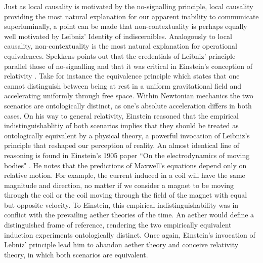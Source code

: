 Just as local causality is motivated by the no-signalling principle, local causality providing the most natural explanation for our apparent inability to communicate superluminally, a point can be made that non-contextuality is perhaps equally well motivated by Leibniz' Identity of indiscernibles. Analogously to local causality, non-contextuality is the most natural explanation for operational equivalences. Spekkens points out that the credentials of Leibniz' principle parallel those of no-signalling and that it was critical in Einstein's conception of relativity \cite{Buchanan2019,Spekkens2019}. Take for instance the equivalence principle which states that one cannot distinguish between being at rest in a uniform gravitational field and accelerating uniformly through free space. Within Newtonian mechanics the two scenarios are ontologically distinct, as one's absolute acceleration differs in both cases. On his way to general relativity, Einstein reasoned that the empirical indistinguishablitiy of both scenarios implies that they should be treated as ontologically equivalent by a physical theory, a powerful invocation of Leibniz's principle that reshaped our perception of reality. An almost identical line of reasoning is found in Einstein’s 1905 paper ``On the electrodynamics of moving bodies" \cite{Einstein1905}. He notes that the predictions of Maxwell's equations depend only on relative motion. For example, the current induced in a coil will have the same magnitude and direction, no matter if we consider a magnet to be moving through the coil or the coil moving through the field of the magnet with equal but opposite velocity. To Einstein, this empirical indistinguishability was in conflict with the prevailing aether theories of the time. An aether would define a distinguished frame of reference, rendering the two empirically equivalent induction experiments ontologically distinct. Once again, Einstein's invocation of Lebniz' principle lead him to abandon aether theory and conceive relativity theory, in which both scenarios are equivalent.

